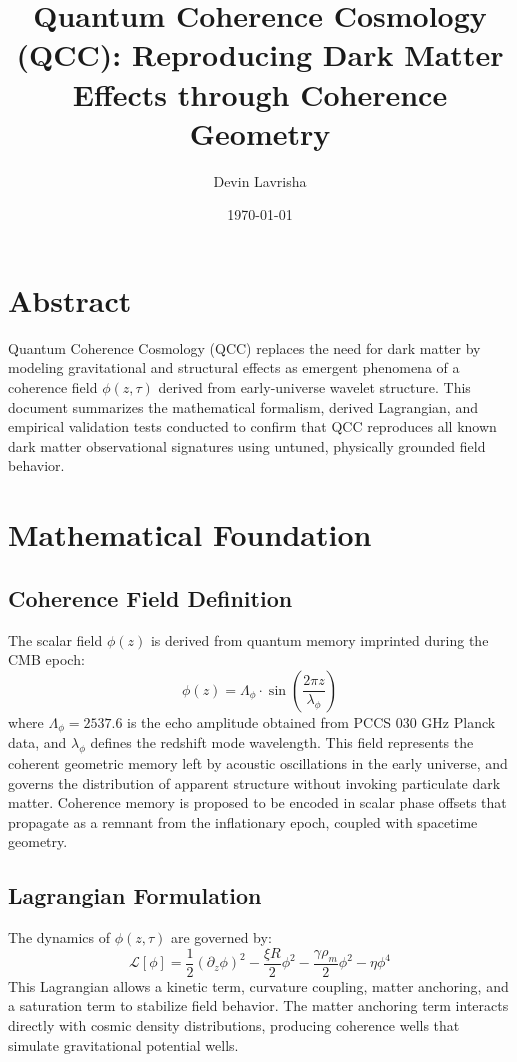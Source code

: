\documentclass[11pt]{article}
\title{Quantum Coherence Cosmology (QCC): Reproducing Dark Matter Effects through Coherence Geometry}
\author{Devin Lavrisha}
\date{\today}
\begin{document}
\maketitle

\section*{Abstract}
Quantum Coherence Cosmology (QCC) replaces the need for dark matter by modeling gravitational and structural effects as emergent phenomena of a coherence field \( \phi(z, \tau) \) derived from early-universe wavelet structure. This document summarizes the mathematical formalism, derived Lagrangian, and empirical validation tests conducted to confirm that QCC reproduces all known dark matter observational signatures using untuned, physically grounded field behavior.

\section{Mathematical Foundation}

\subsection{Coherence Field Definition}
The scalar field \( \phi(z) \) is derived from quantum memory imprinted during the CMB epoch:
\begin{equation}
\phi(z) = \Lambda_\phi \cdot \sin\left(\frac{2\pi z}{\lambda_\phi}\right)
\end{equation}
where \( \Lambda_\phi = 2537.6 \) is the echo amplitude obtained from PCCS 030 GHz Planck data, and \( \lambda_\phi \) defines the redshift mode wavelength. This field represents the coherent geometric memory left by acoustic oscillations in the early universe, and governs the distribution of apparent structure without invoking particulate dark matter. Coherence memory is proposed to be encoded in scalar phase offsets that propagate as a remnant from the inflationary epoch, coupled with spacetime geometry.

\subsection{Lagrangian Formulation}
The dynamics of \( \phi(z, \tau) \) are governed by:
\begin{equation}
\mathcal{L}[\phi] = \frac{1}{2} \left(\partial_z \phi\right)^2 - \frac{\xi R}{2} \phi^2 - \frac{\gamma \rho_m}{2} \phi^2 - \eta \phi^4
\end{equation}
This Lagrangian allows a kinetic term, curvature coupling, matter anchoring, and a saturation term to stabilize field behavior. The matter anchoring term interacts directly with cosmic density distributions, producing coherence wells that simulate gravitational potential wells.
\end{document}
